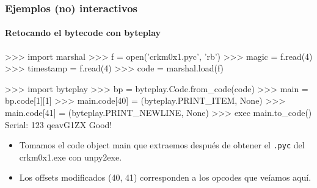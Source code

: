 \documentclass[9pt, notes=hide]{beamer}
\begin{document}
\begin{frame}[fragile]
    \frametitle{Ejemplos (no) interactivos}
    \framesubtitle{Retocando el bytecode con byteplay}

\begin{python}
>>> import marshal
>>> f = open('crkm0x1.pyc', 'rb')
>>> magic = f.read(4)
>>> timestamp = f.read(4)
>>> code = marshal.load(f)

>>> import byteplay
>>> bp = byteplay.Code.from_code(code)
>>> main = bp.code[1][1]
>>> main.code[40] = (byteplay.PRINT_ITEM, None)
>>> main.code[41] = (byteplay.PRINT_NEWLINE, None)
>>> exec main.to_code()
Serial: 123
qeavG1ZX
Good!
\end{python}

\begin{beamerboxesrounded}[shadow=true]{}
    \begin{itemize}
        \item Tomamos el code object main que extraemos después de obtener el \texttt{.pyc} del crkm0x1.exe con unpy2exe.
        \item Los offsets modificados (40, 41) corresponden a los opcodes que veíamos aquí.
    \end{itemize}
\end{beamerboxesrounded}

\end{frame}


\end{document}
